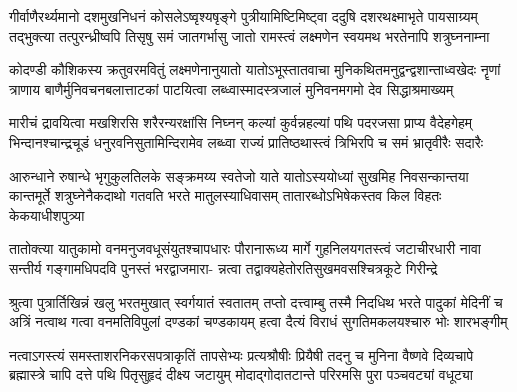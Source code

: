 

\translink{}

\storymeta

\fourlineindentedshloka
{गीर्वाणैरर्थ्यमानो दशमुखनिधनं कोसलेऽष्वृश्यषृङ्गे}
{पुत्रीयामिष्टिमिष्ट्वा ददुषि दशरथक्ष्माभृते पायसाग्र्यम्}
{तद्भुक्त्या तत्पुरन्ध्रीष्वपि तिसृषु समं जातगर्भासु जातो}
{रामस्त्वं लक्ष्मणेन स्वयमथ भरतेनापि शत्रुघ्ननाम्ना} %

\fourlineindentedshloka
{कोदण्डी कौशिकस्य क्रतुवरमवितुं लक्ष्मणेनानुयातो}
{यातोऽभूस्तातवाचा मुनिकथितमनुद्वन्द्वशान्ताध्वखेदः}
{नॄणां त्राणाय बाणैर्मुनिवचनबलात्ताटकां पाटयित्वा}
{लब्ध्वास्मादस्त्रजालं मुनिवनमगमो देव सिद्धाश्रमाख्यम्} %

\fourlineindentedshloka
{मारीचं द्रावयित्वा मखशिरसि शरैरन्यरक्षांसि निघ्नन्}
{कल्यां कुर्वन्नहल्यां पथि पदरजसा प्राप्य वैदेहगेहम्}
{भिन्दानश्चान्द्रचूडं धनुरवनिसुतामिन्दिरामेव लब्ध्वा}
{राज्यं प्रातिष्ठथास्त्वं त्रिभिरपि च समं भ्रातृवीरैः सदारैः} %

\fourlineindentedshloka
{आरुन्धाने रुषान्धे भृगुकुलतिलके सङ्क्रमय्य स्वतेजो}
{याते यातोऽस्ययोध्यां सुखमिह निवसन्कान्तया कान्तमूर्ते}
{शत्रुघ्नेनैकदाथो गतवति भरते मातुलस्याधिवासम्}
{तातारब्धोऽभिषेकस्तव किल विहतः केकयाधीशपुत्र्या} %

\fourlineindentedshloka
{तातोक्त्या यातुकामो वनमनुजवधूसंयुतश्चापधारः}
{पौरानारूध्य मार्गे गुहनिलयगतस्त्वं जटाचीरधारी}
{नावा सन्तीर्य गङ्गामधिपदवि पुनस्तं भरद्वाजमारा-}
{न्नत्वा तद्वाक्यहेतोरतिसुखमवसश्चित्रकूटे गिरीन्द्रे} %

\fourlineindentedshloka
{श्रुत्वा पुत्रार्तिखिन्नं खलु भरतमुखात् स्वर्गयातं स्वतातम्}
{तप्तो दत्त्वाम्बु तस्मै निदधिथ भरते पादुकां मेदिनीं च}
{अत्रिं नत्वाथ गत्वा वनमतिविपुलां दण्डकां चण्डकायम्}
{हत्वा दैत्यं विराधं सुगतिमकलयश्चारु भोः शारभङ्गीम्} %

\fourlineindentedshloka
{नत्वाऽगस्त्यं समस्ताशरनिकरसपत्राकृतिं तापसेभ्यः}
{प्रत्यश्रौषीः प्रियैषी तदनु च मुनिना वैष्णवे दिव्यचापे}
{ब्रह्मास्त्रे चापि दत्ते पथि पितृसुहृदं दीक्ष्य जटायुम्}
{मोदाद्गोदातटान्ते परिरमसि पुरा पञ्चवट्यां वधूट्या} %

